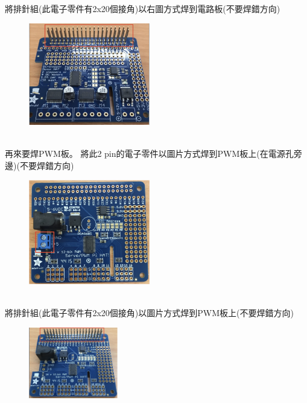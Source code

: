 \documentclass{article}
\begin{document}
\\
將排針組(此電子零件有2x20個接角)以右圖方式焊到電路板(不要焊錯方向)
\\
\begin{figure}[htp]
    \begin{center}
        \includegraphics[width=150pt]{pic/1_1_24.png}
    \end{center}
\end{figure}
\\
再來要焊PWM板。 將此2 pin的電子零件以圖片方式焊到PWM板上(在電源孔旁邊)(不要焊錯方向) 
\\
\begin{figure}[htp]
    \begin{center}
        \includegraphics[width=150pt]{pic/1_1_9.png}
    \end{center}
\end{figure}
\\
將排針組(此電子零件有2x20個接角)以圖片方式焊到PWM板上(不要焊錯方向)
\\
\begin{figure}[htp]
    \begin{center}
        \includegraphics[width=110pt]{pic/1_1_10.png}
    \end{center}
\end{figure}
\\
\end{document}
